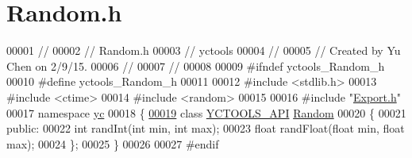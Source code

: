 \hypertarget{_random_8h_source}{}\section{Random.\+h}
\label{_random_8h_source}

\begin{DoxyCode}
00001 \textcolor{comment}{//}
00002 \textcolor{comment}{//  Random.h}
00003 \textcolor{comment}{//  yctools}
00004 \textcolor{comment}{//}
00005 \textcolor{comment}{//  Created by Yu Chen on 2/9/15.}
00006 \textcolor{comment}{//}
00007 \textcolor{comment}{//}
00008 
00009 \textcolor{preprocessor}{#ifndef yctools\_Random\_h}
00010 \textcolor{preprocessor}{#define yctools\_Random\_h}
00011 
00012 \textcolor{preprocessor}{#include <stdlib.h>}
00013 \textcolor{preprocessor}{#include <ctime>}
00014 \textcolor{preprocessor}{#include <random>}
00015 
00016 \textcolor{preprocessor}{#include "\hyperlink{yctools_2_export_8h}{Export.h}"}
00017 \textcolor{keyword}{namespace }\hyperlink{namespaceyc}{yc}
00018 \{
\hypertarget{_random_8h_source_l00019}{}\hyperlink{classyc_1_1_random}{00019}     \textcolor{keyword}{class }\hyperlink{yctools_2_export_8h_aa9bd63af2d697c3f5d9ee84516c21762}{YCTOOLS\_API} \hyperlink{classyc_1_1_random}{Random}
00020     \{
00021     \textcolor{keyword}{public}:
00022         \textcolor{keywordtype}{int} randInt(\textcolor{keywordtype}{int} min, \textcolor{keywordtype}{int} max);
00023         \textcolor{keywordtype}{float} randFloat(\textcolor{keywordtype}{float} min, \textcolor{keywordtype}{float} max);
00024     \};
00025 \}
00026 
00027 \textcolor{preprocessor}{#endif}
\end{DoxyCode}

